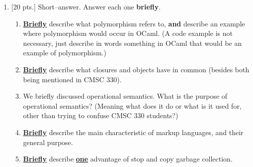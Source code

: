 \documentclass[11pt]{article}
\begin{document}
  \pagebreak

  \addtolength{\headsep}{4mm}

  \addtolength{\textheight}{2mm}

  \pagestyle{headings}


  \begin{enumerate}


    \item {[20 pts.]} Short--answer.  Answer each one \textbf{briefly}.

          \vspace{-3.5mm}

          \begin{enumerate}

            \addtolength{\itemsep}{39.5mm}

            \item \textbf{\underline{Briefly}} describe what polymorphism
                  refers to, \textbf{and} describe an example where
                  polymorphism would occur in OCaml.  (A code example is not
                  necessary, just describe in words something in OCaml that
                  would be an example of polymorphism.)

            \item \textbf{\underline{Briefly}} describe what closures and
                  objects have in common (besides both being mentioned
                  in CMSC 330).

            \item We briefly discussed operational semantics.  What is the
                  purpose of operational semantics?  (Meaning what does it
                  do or what is it used for, other than trying to confuse
                  CMSC 330 students?)

            \item \textbf{\underline{Briefly}} describe the main
                  characteristic of markup languages, and their general
                  purpose.

            \item \textbf{\underline{Briefly}} describe
                  \textbf{\underline{one}} advantage of stop and copy
                  garbage collection.


\end{enumerate}
\end{enumerate}
\end{document}
